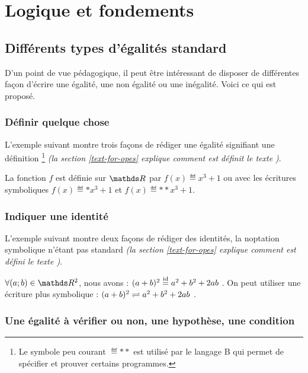 \documentclass[12pt,a4paper]{article}
\theoremstyle{definition}
\begin{document}
\section{Logique et fondements}

\subsection{Différents types d'égalités \og standard \fg}

D'un point de vue pédagogique, il peut être intéressant de disposer de différentes façon d'écrire une égalité, une non égalité ou une inégalité. Voici ce qui est proposé.

\subsubsection{Définir quelque chose}

L'exemple suivant montre trois façons de rédiger une égalité signifiant une définition
\footnote{
	Le symbole peu courant $\eqdef**$ est utilisé par le langage B qui permet de spécifier et prouver certains programmes.
}
\emph{(la section \ref{text-for-opes} explique comment est définit le texte \emph{\og \textopdef \fg})}.

\begin{tcblisting}{}
La fonction $f$ est définie sur $\RR$ par $f(x) \eqdef x^3 + 1$ ou avec les écritures
symboliques $f(x) \eqdef* x^3 + 1$ et $f(x) \eqdef** x^3 + 1$.
\end{tcblisting}


\subsubsection{Indiquer une identité}

L'exemple suivant montre deux façons de rédiger des identités, la noptation symbolique n'étant pas standard \emph{(la section \ref{text-for-opes} explique comment est défini le texte \emph{\og \textopid \fg})}.

\begin{tcblisting}{}
$\forall (a ; b) \in \RR^2$, nous avons : $(a + b)^2 \eqid a^2 + b^2 + 2 a b$ .
On peut utiliser une écriture plus symbolique : $(a + b)^2 \eqid* a^2 + b^2 + 2 a b$ .
\end{tcblisting}


\subsubsection{Une égalité à vérifier ou non, une hypothèse, une condition}
\end{document}
